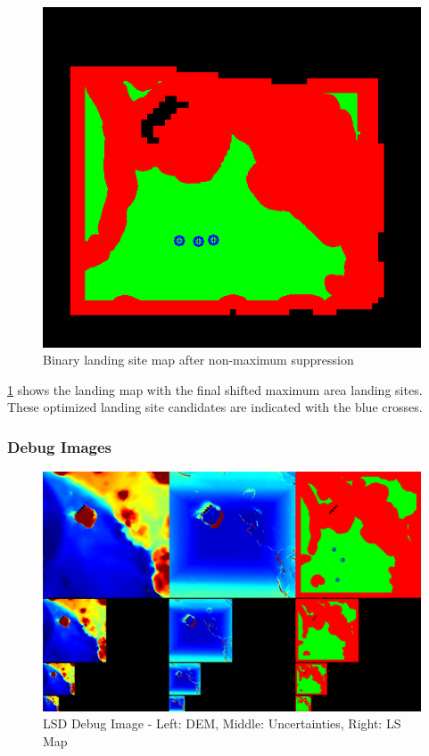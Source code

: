 \documentclass{article}
\begin{document}
\begin{figure}[ht!]
    \centering
    \includegraphics[scale=0.5]{images/system_overview/landing_map_marked.png}
    \caption{Binary landing site map after non-maximum suppression}
    \label{fig:ls_map_nps}
\end{figure}

\cref{fig:ls_map_nps} shows the landing map with the final shifted maximum area landing sites. These optimized landing site candidates are indicated with the blue crosses. 

\clearpage %

\subsubsection{Debug Images}

\begin{figure}[ht!]
    \centering
    \includegraphics[scale=0.25]{images/system_overview/lsd_debug_image.png}
    \caption{LSD Debug Image - Left: DEM, Middle: Uncertainties, Right: LS Map}
    \label{fig:lsd_debug} %
\end{figure}
\end{document}

